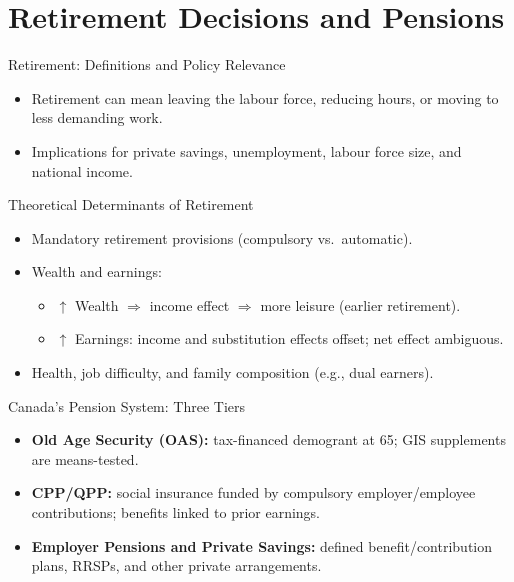 \documentclass[aspectratio=169]{beamer}
\begin{document}
\section{Retirement Decisions and Pensions}

\begin{frame}{Retirement: Definitions and Policy Relevance}
\transfade
\begin{itemize}[<+->]
  \item Retirement can mean leaving the labour force, reducing hours, or moving to less demanding work.
  \item Implications for private savings, unemployment, labour force size, and national income.
\end{itemize}
\end{frame}

\begin{frame}{Theoretical Determinants of Retirement}
\transfade
\begin{itemize}[<+->]
  \item Mandatory retirement provisions (compulsory vs.\ automatic).
  \item Wealth and earnings:
    \begin{itemize}[<+->]
      \item \(\uparrow\) Wealth \(\Rightarrow\) income effect \(\Rightarrow\) more leisure (earlier retirement).
      \item \(\uparrow\) Earnings: income and substitution effects offset; net effect ambiguous.
    \end{itemize}
  \item Health, job difficulty, and family composition (e.g., dual earners).
\end{itemize}
\end{frame}

\begin{frame}{Canada’s Pension System: Three Tiers}
\transfade
\begin{itemize}[<+->]
  \item \textbf{Old Age Security (OAS):} tax-financed demogrant at 65; GIS supplements are means-tested.
  \item \textbf{CPP/QPP:} social insurance funded by compulsory employer/employee contributions; benefits linked to prior earnings.
  \item \textbf{Employer Pensions and Private Savings:} defined benefit/contribution plans, RRSPs, and other private arrangements.
\end{itemize}
\end{frame}
\end{document}

